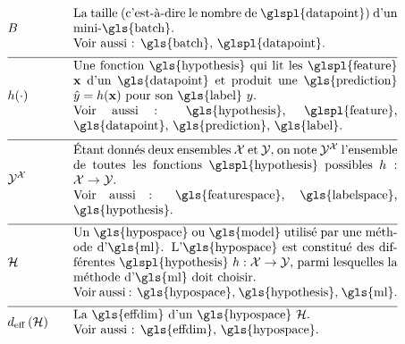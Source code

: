 \begin{align}
	& \batchsize & \quad & \parbox{.75\textwidth}{La taille (c’est-à-dire le nombre de \glspl{datapoint}) d’un mini-\gls{batch}. \\ Voir aussi : \gls{batch}, \glspl{datapoint}.} \nonumber \\[2mm] \hline \nonumber\\[-5mm]
	& \hypothesis(\cdot) & \quad & \parbox{.75\textwidth}{Une fonction \gls{hypothesis} qui lit les \glspl{feature} $\featurevec$ d’un \gls{datapoint} et produit une \gls{prediction} $\hat{\truelabel}=\hypothesis(\featurevec)$ pour son \gls{label} $\truelabel$. \\ Voir aussi : \gls{hypothesis}, \glspl{feature}, \gls{datapoint}, \gls{prediction}, \gls{label}.} \nonumber \\[2mm] \hline \nonumber\\[-5mm]
	& \labelspace^{\featurespace} & \quad & \parbox{.75\textwidth}{Étant donnés deux ensembles $\featurespace$ et $\labelspace$, on note $\labelspace^{\featurespace}$ l’ensemble de toutes les fonctions \glspl{hypothesis} possibles $\hypothesis: \featurespace \rightarrow \labelspace$. \\ Voir aussi : \gls{featurespace}, \gls{labelspace}, \gls{hypothesis}.} \nonumber \\[2mm] \hline \nonumber\\[-5mm]
	& \hypospace & \quad & \parbox{.75\textwidth}{Un \gls{hypospace} ou \gls{model} utilisé par une méthode d’\gls{ml}. L'\gls{hypospace} est constitué des différentes \glspl{hypothesis} $\hypothesis: \featurespace \rightarrow \labelspace$, parmi lesquelles la méthode d’\gls{ml} doit choisir. \\ Voir aussi : \gls{hypospace}, \gls{hypothesis}, \gls{ml}.} \nonumber \\[2mm] \hline \nonumber\\[-5mm]
	& \effdim{\hypospace} & \quad & \parbox{.75\textwidth}{La \gls{effdim} d’un \gls{hypospace} $\hypospace$. \\ Voir aussi : \gls{effdim}, \gls{hypospace}.} \nonumber
\end{align}


